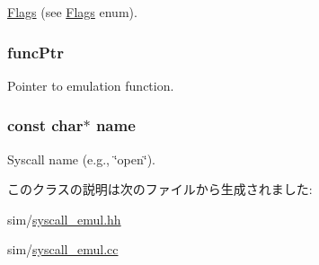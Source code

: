 \hyperlink{classFlags}{Flags} (see \hyperlink{classFlags}{Flags} enum). \hypertarget{classSyscallDesc_ac49878af22e8dd4a329010118f69eafa}{
\subsubsection[{funcPtr}]{ {\bf funcPtr}}}
\label{classSyscallDesc_ac49878af22e8dd4a329010118f69eafa}


Pointer to emulation function. \hypertarget{classSyscallDesc_a8f8f80d37794cde9472343e4487ba3eb}{
\subsubsection[{name}]{\setlength{\rightskip}{0pt plus 5cm}const char$\ast$ {\bf name}}}
\label{classSyscallDesc_a8f8f80d37794cde9472343e4487ba3eb}


Syscall name (e.g., \char`\"{}open\char`\"{}). 

このクラスの説明は次のファイルから生成されました:\begin{DoxyCompactItemize}
\item 
sim/\hyperlink{syscall__emul_8hh}{syscall\_\-emul.hh}\item 
sim/\hyperlink{syscall__emul_8cc}{syscall\_\-emul.cc}\end{DoxyCompactItemize}
